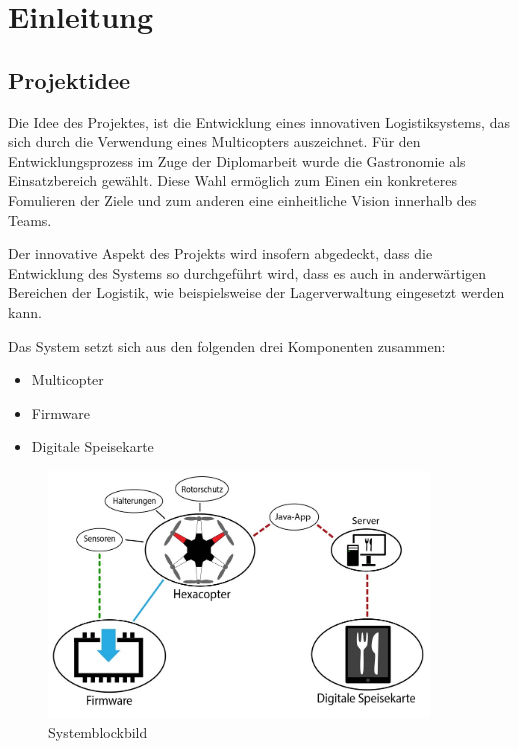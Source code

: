 \chapter{Einleitung}
\renewcommand{\kapitelautor}{Autor: Markus Kaiser}

\section{Projektidee}
Die Idee des Projektes, ist die Entwicklung eines innovativen Logistiksystems, das sich durch die Verwendung eines Multicopters auszeichnet.
Für den Entwicklungsprozess im Zuge der Diplomarbeit wurde die Gastronomie als Einsatzbereich gewählt. Diese Wahl ermöglich zum Einen
ein konkreteres Fomulieren der Ziele und zum anderen eine einheitliche Vision innerhalb des Teams.

Der innovative Aspekt des Projekts wird insofern abgedeckt, dass die Entwicklung des Systems so durchgeführt wird,
dass es auch in anderwärtigen Bereichen der Logistik, wie beispielsweise der Lagerverwaltung eingesetzt werden kann.

Das System setzt sich aus den folgenden drei Komponenten zusammen:

\begin{itemize}
  \item Multicopter
  \item Firmware
  \item Digitale Speisekarte
\end{itemize}

\begin{figure}[H]
  \begin{centering}
  \includegraphics[width = 0.9\textwidth]{Bilder/systemblockbild.jpg}
  \par\end{centering}
  \caption{Systemblockbild}
  \label{Systemblockbild}
\end{figure}

